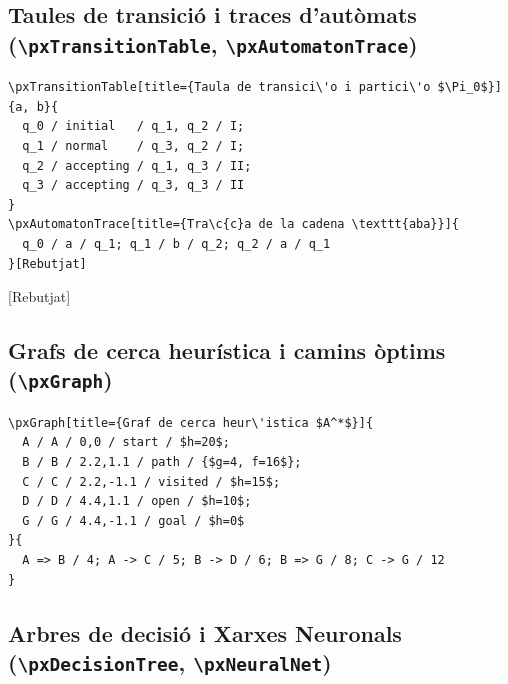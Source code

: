 \documentclass[11pt,a4paper]{article}
\begin{document}
\subsection{Taules de transici\'o i traces d'aut\`omats (\texttt{\textbackslash pxTransitionTable}, \texttt{\textbackslash pxAutomatonTrace})}

\begin{verbatim}
\pxTransitionTable[title={Taula de transici\'o i partici\'o $\Pi_0$}]{a, b}{
  q_0 / initial   / q_1, q_2 / I;
  q_1 / normal    / q_3, q_2 / I;
  q_2 / accepting / q_1, q_3 / II;
  q_3 / accepting / q_3, q_3 / II
}
\pxAutomatonTrace[title={Tra\c{c}a de la cadena \texttt{aba}}]{
  q_0 / a / q_1; q_1 / b / q_2; q_2 / a / q_1
}[Rebutjat]
\end{verbatim}


[Rebutjat]

\subsection{Grafs de cerca heur\'istica i camins \`optims (\texttt{\textbackslash pxGraph})}

\begin{verbatim}
\pxGraph[title={Graf de cerca heur\'istica $A^*$}]{
  A / A / 0,0 / start / $h=20$;
  B / B / 2.2,1.1 / path / {$g=4, f=16$};
  C / C / 2.2,-1.1 / visited / $h=15$;
  D / D / 4.4,1.1 / open / $h=10$;
  G / G / 4.4,-1.1 / goal / $h=0$
}{
  A => B / 4; A -> C / 5; B -> D / 6; B => G / 8; C -> G / 12
}
\end{verbatim}


\subsection{Arbres de decisi\'o i Xarxes Neuronals (\texttt{\textbackslash pxDecisionTree}, \texttt{\textbackslash pxNeuralNet})}
\end{document}
